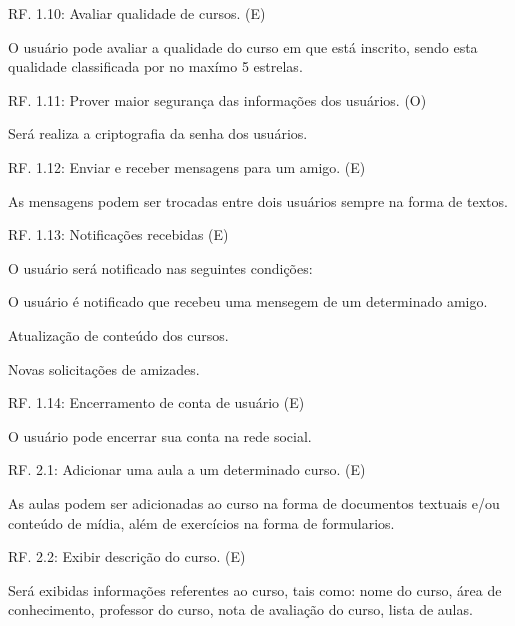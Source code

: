 \documentclass[12pt,a4paper,onecolumn,titlepage]{article}
\begin{document}
\begin{description}
\item RF. 1.10: Avaliar qualidade de cursos. (E)
\item \qquad O usuário pode avaliar a qualidade do curso em que está inscrito, sendo esta qualidade classificada por no maxímo 5 estrelas.

\item RF. 1.11: Prover maior segurança das informações dos usuários. (O)
\item \qquad Será realiza a criptografia da senha dos usuários.

\item RF. 1.12: Enviar e receber mensagens para um amigo. (E)
\item \qquad As mensagens podem ser trocadas entre dois usuários sempre na forma de textos.



\item RF. 1.13: Notificações recebidas (E)
\item \qquad O usuário será notificado nas seguintes condições:
\item \qquad O usuário é notificado que recebeu uma mensegem de um determinado amigo.
\item \qquad Atualização de conteúdo dos cursos.
\item \qquad Novas solicitações de amizades.

\item RF. 1.14: Encerramento de conta de usuário (E)
\item \qquad O usuário pode encerrar sua conta na rede social.

\item RF. 2.1: Adicionar uma aula a um determinado curso. (E)
\item \qquad As aulas podem ser adicionadas ao curso na forma de documentos textuais e/ou conteúdo de mídia, além de exercícios na forma de formularios.

\item RF. 2.2: Exibir descrição do curso. (E)
\item \qquad Será exibidas informações referentes ao curso, tais como: nome do curso, área de conhecimento, professor do curso, nota de avaliação do curso, lista de aulas.



\end{description}
\end{document}
